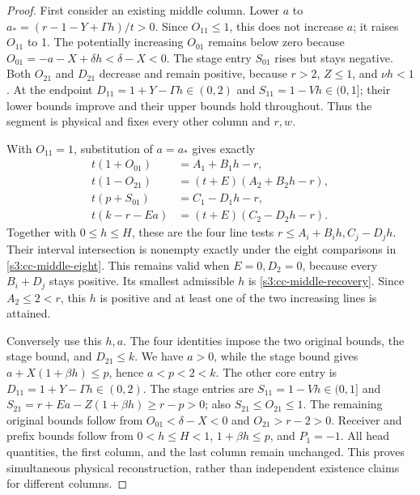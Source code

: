 \documentclass[11pt,reqno]{amsart}
\theoremstyle{definition}
\theoremstyle{remark}
\begin{document}
\begin{proof}
First consider an existing middle column. Lower \(a\) to
\(a_*=(r-1-Y+\Gamma h)/t>0\). Since \(O_{11}\le1\),
this does not increase \(a\); it raises \(O_{11}\) to 1.
The potentially increasing \(O_{01}\) remains below zero because
\(O_{01}=-a-X+\delta h<\delta-X<0\).
The stage entry \(S_{01}\) rises but stays negative.
Both \(O_{21}\) and \(D_{21}\) decrease and remain positive,
because \(r>2\), \(Z\le1\), and \(\nu h<1\).
At the endpoint \(D_{11}=1+Y-\Gamma h\in(0,2)\) and
\(S_{11}=1-Vh\in(0,1]\); their lower bounds improve and their
upper bounds hold throughout. Thus the segment is physical and fixes
every other column and \(r,w\).

With \(O_{11}=1\), substitution of \(a=a_*\) gives exactly
\begin{align*}
 t(1+O_{01})&=A_1+B_1h-r,\\
 t(1-O_{21})&=(t+E)(A_2+B_2h-r),\\
 t(p+S_{01})&=C_1-D_1h-r,\\
 t(k-r-Ea)&=(t+E)(C_2-D_2h-r).
\end{align*}
Together with \(0\le h\le H\), these are the four line tests
\(r\le A_i+B_i h,C_j-D_jh\).
Their interval intersection is nonempty exactly under the eight
comparisons in \eqref{s3:cc-middle-eight}. This remains valid when
\(E=0,D_2=0\), because every \(B_i+D_j\) stays positive.
Its smallest admissible \(h\) is \eqref{s3:cc-middle-recovery}.
Since \(A_2\le2<r\), this \(h\) is positive and at least one
of the two increasing lines is attained.

Conversely use this \(h,a\). The four identities impose the two
original bounds, the stage bound, and \(D_{21}\le k\).
We have \(a>0\), while the stage bound gives
\(a+X(1+\beta h)\le p\), hence \(a<p<2<k\).
The other core entry is \(D_{11}=1+Y-\Gamma h\in(0,2)\).
The stage entries are \(S_{11}=1-Vh\in(0,1]\) and
\(S_{21}=r+Ea-Z(1+\beta h)\ge r-p>0\);
also \(S_{21}\le O_{21}\le1\).
The remaining original bounds follow from
\(O_{01}<\delta-X<0\) and \(O_{21}>r-2>0\).
Receiver and prefix bounds follow from \(0<h\le H<1\),
\(1+\beta h\le p\), and \(P_1=-1\).
All head quantities, the first column, and the last column remain
unchanged. This proves simultaneous physical reconstruction, rather
than independent existence claims for different columns.
\end{proof}

\end{document}
